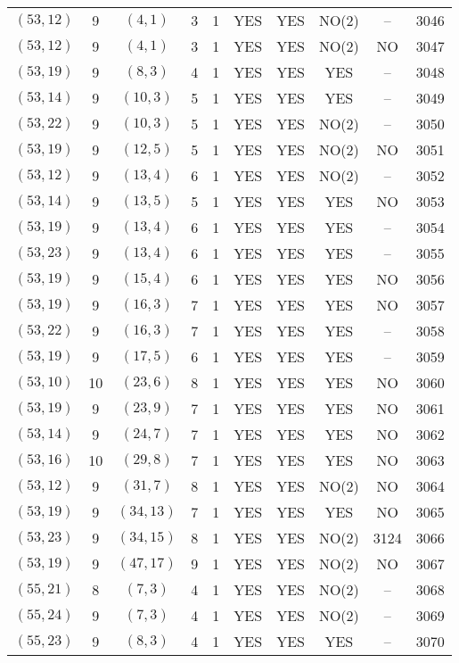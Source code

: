 \begin{longtable}{|c|c|c|c|c|c|c|c|c|c|}
$(53, 12)$ & 9 & $(4, 1)$ & 3 & 1 & YES & YES & NO(2) & -- & 3046\\
$(53, 12)$ & 9 & $(4, 1)$ & 3 & 1 & YES & YES & NO(2) & NO & 3047\\
$(53, 19)$ & 9 & $(8, 3)$ & 4 & 1 & YES & YES & YES & -- & 3048\\
$(53, 14)$ & 9 & $(10, 3)$ & 5 & 1 & YES & YES & YES & -- & 3049\\
$(53, 22)$ & 9 & $(10, 3)$ & 5 & 1 & YES & YES & NO(2) & -- & 3050\\
$(53, 19)$ & 9 & $(12, 5)$ & 5 & 1 & YES & YES & NO(2) & NO & 3051\\
$(53, 12)$ & 9 & $(13, 4)$ & 6 & 1 & YES & YES & NO(2) & -- & 3052\\
$(53, 14)$ & 9 & $(13, 5)$ & 5 & 1 & YES & YES & YES & NO & 3053\\
$(53, 19)$ & 9 & $(13, 4)$ & 6 & 1 & YES & YES & YES & -- & 3054\\
$(53, 23)$ & 9 & $(13, 4)$ & 6 & 1 & YES & YES & YES & -- & 3055\\
$(53, 19)$ & 9 & $(15, 4)$ & 6 & 1 & YES & YES & YES & NO & 3056\\
$(53, 19)$ & 9 & $(16, 3)$ & 7 & 1 & YES & YES & YES & NO & 3057\\
$(53, 22)$ & 9 & $(16, 3)$ & 7 & 1 & YES & YES & YES & -- & 3058\\
$(53, 19)$ & 9 & $(17, 5)$ & 6 & 1 & YES & YES & YES & -- & 3059\\
$(53, 10)$ & 10 & $(23, 6)$ & 8 & 1 & YES & YES & YES & NO & 3060\\
$(53, 19)$ & 9 & $(23, 9)$ & 7 & 1 & YES & YES & YES & NO & 3061\\
$(53, 14)$ & 9 & $(24, 7)$ & 7 & 1 & YES & YES & YES & NO & 3062\\
$(53, 16)$ & 10 & $(29, 8)$ & 7 & 1 & YES & YES & YES & NO & 3063\\
$(53, 12)$ & 9 & $(31, 7)$ & 8 & 1 & YES & YES & NO(2) & NO & 3064\\
$(53, 19)$ & 9 & $(34, 13)$ & 7 & 1 & YES & YES & YES & NO & 3065\\
$(53, 23)$ & 9 & $(34, 15)$ & 8 & 1 & YES & YES & NO(2) & 3124 & 3066\\
$(53, 19)$ & 9 & $(47, 17)$ & 9 & 1 & YES & YES & NO(2) & NO & 3067\\
$(55, 21)$ & 8 & $(7, 3)$ & 4 & 1 & YES & YES & NO(2) & -- & 3068\\
$(55, 24)$ & 9 & $(7, 3)$ & 4 & 1 & YES & YES & NO(2) & -- & 3069\\
$(55, 23)$ & 9 & $(8, 3)$ & 4 & 1 & YES & YES & YES & -- & 3070\\

\end{longtable}
